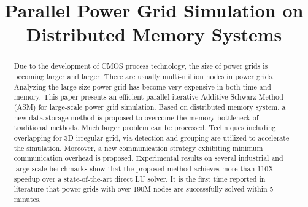 \documentclass{sig-alternate}
\begin{document}
\title{Parallel Power Grid Simulation on Distributed Memory Systems}

\maketitle

\begin{comment}
This paper presents an efficient parallel Domain Decomposition method for large-scale power grid simulation. 
Based on multi-core platform, a new data storage strategy is proposed to overcome the memory bottleneck of traditional methods. 
Techniques as 3D irregular grid friendly overlapping, via detection as well as grouping techniques are utilized to accelerate the 
simulation. A new communication strategy is proposed and exhibits minimum communication overhead. Experimental results on several 
industrial and large-scale benchmarks show that the proposed method achieves more than 110X speedup over a state-of-the-art direct 
LU solver. Power grid containing over 190M nodes could be solved within 5 minutes.
\end{comment}

\begin{abstract}
Due to the development of CMOS process technology, the size of power grids is becoming larger and larger. There are usually 
multi-million nodes in power grids. Analyzing the large size power grid has become very expensive in both time and memory. This paper 
presents an efficient parallel iterative Additive Schwarz Method (ASM) for large-scale power grid simulation. Based on distributed 
memory system, a new 
data storage method is proposed to overcome the memory bottleneck of traditional methods. Much larger problem can be processed. 
Techniques including overlapping for 3D irregular grid, via detection and grouping are utilized to accelerate the 
simulation. Moreover, a new communication strategy exhibiting minimum communication overhead is proposed. Experimental results on 
several 
industrial and large-scale benchmarks show that the proposed method achieves more than 110X speedup over a state-of-the-art direct 
LU solver. It is the first time reported in literature that power grids with over 190M nodes are successfully solved within 5 minutes.	
\end{abstract}
\end{document}
